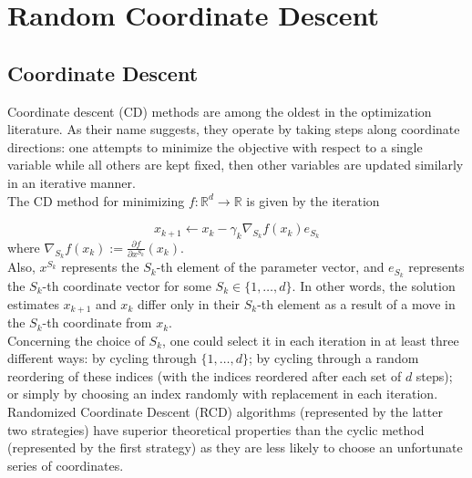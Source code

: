 \documentclass[12pt]{report}
\begin{document}

\maketitle

\vspace*{.1in}





\section{Random Coordinate Descent}

\subsection{Coordinate Descent}
Coordinate descent (CD) methods are among the oldest in the optimization literature. As their name suggests, they operate by taking steps along coordinate directions: one attempts to minimize the objective with respect to a single variable while all others are kept fixed, then other variables are updated similarly in an iterative manner. \\

The CD method for minimizing $f: \mathbb{R}^d \to \mathbb{R}$ is given by the iteration

$$x_{k+1} \leftarrow x_k - \gamma_k \nabla_{S_k} f(x_k) e_{S_k}$$
where $\nabla_{S_k} f(x_k) := \frac{\partial f}{\partial x^{S_k}}(x_k)$.\\

Also, $x^{S_k}$ represents the $S_k$-th element of the parameter vector, and $e_{S_k}$ represents the $S_k$-th coordinate vector for some $S_k \in \{1,\dots, d\}.$ In other words, the solution estimates $x_{k+1}$ and $x_k$ differ only in their $S_k$-th element as a result of a move in the $S_k$-th coordinate from $x_k$.\\

Concerning the choice of $S_k$, one could select it in each iteration in at least three different ways: by cycling through $\{1, \dots, d\}$; by cycling through a random reordering of these indices (with the indices reordered after each set of $d$ steps); or simply by choosing an index randomly with replacement in each iteration. Randomized Coordinate Descent (RCD) algorithms (represented by the latter two strategies) have superior theoretical properties than the cyclic method (represented by the first strategy) as they are less likely to choose an unfortunate series of coordinates.\\
\end{document}
